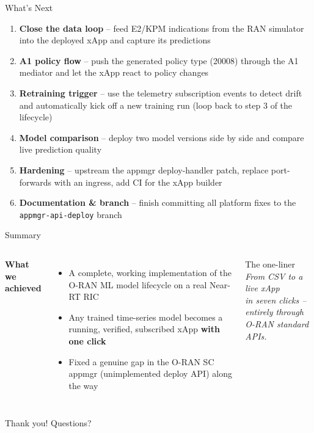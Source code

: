 \documentclass[aspectratio=169]{beamer}
\begin{document}
\begin{frame}{What's Next}
  \begin{enumerate}
    \item \textbf{Close the data loop} -- feed E2/KPM indications from the RAN
      simulator into the deployed xApp and capture its predictions
    \item \textbf{A1 policy flow} -- push the generated policy type (20008)
      through the A1 mediator and let the xApp react to policy changes
    \item \textbf{Retraining trigger} -- use the telemetry subscription events
      to detect drift and automatically kick off a new training run (loop back
      to step 3 of the lifecycle)
    \item \textbf{Model comparison} -- deploy two model versions side by side
      and compare live prediction quality
    \item \textbf{Hardening} -- upstream the appmgr deploy-handler patch,
      replace port-forwards with an ingress, add CI for the xApp builder
    \item \textbf{Documentation \& branch} -- finish committing all platform
      fixes to the \texttt{appmgr-api-deploy} branch
  \end{enumerate}
\end{frame}

\begin{frame}{Summary}
  \begin{columns}
    \textbf{What we achieved}
    \begin{itemize}
      \item A complete, working implementation of the O-RAN ML model lifecycle
        on a real Near-RT RIC
      \item Any trained time-series model becomes a running, verified,
        subscribed xApp \textbf{with one click}
      \item Fixed a genuine gap in the O-RAN SC appmgr (unimplemented deploy
        API) along the way
    \end{itemize}
    \begin{exampleblock}{The one-liner}
      \centering
      \emph{From CSV to a live xApp\\in seven clicks --\\entirely through\\O-RAN standard APIs.}
    \end{exampleblock}
  \end{columns}
  \vspace{1em}
  \centering
  \large Thank you! Questions?
\end{frame}
\end{document}
